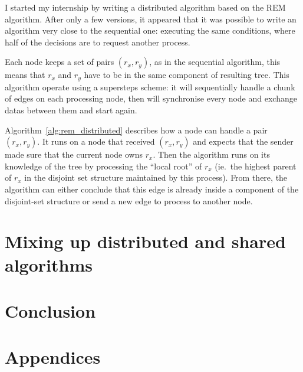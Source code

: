 \documentclass[12px]{article}
\begin{document}
    I started my internship by writing a distributed algorithm based on the REM algorithm. After only a few versions, it appeared that it was possible to write an algorithm very close to the sequential one: executing the same conditions, where half of the decisions are to request another process.

    Each node keeps a set of pairs $(r_x, r_y)$, as in the sequential algorithm, this means that $r_x$ and $r_y$ have to be in the same component of resulting tree.
    This algorithm operate using a supersteps scheme: it will sequentially handle a chunk of edges on each processing node, then will synchronise every node and exchange datas between them and start again.

    Algorithm~\ref{alg:rem_distributed} describes how a node can handle a pair $(r_x, r_y)$.
    It runs on a node that received $(r_x, r_y)$ and expects that the sender made sure that the current node owns $r_x$. Then the algorithm runs on its knowledge of the tree by processing the ``local root'' of $r_x$ (ie.\ the highest parent of $r_x$ in the disjoint set structure maintained by this process).
    From there, the algorithm can either conclude that this edge is already inside a component of the disjoint-set structure or send a new edge to process to another node.


  \section{Mixing up distributed and shared algorithms}


  \section{Conclusion}


  \section{Appendices}


  
  
\end{document}
